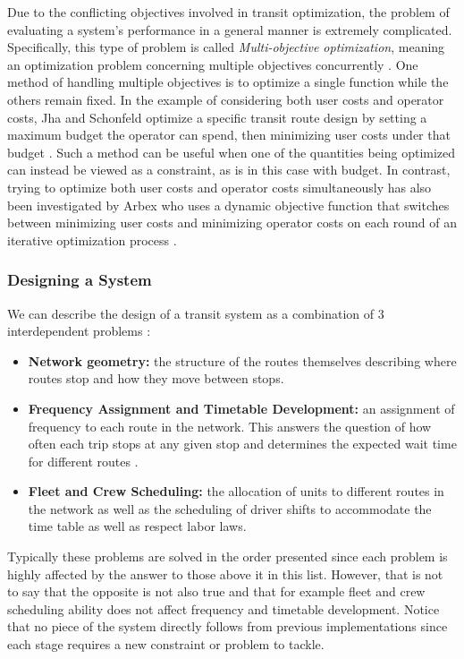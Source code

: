 \documentclass[11pt]{amsart}
\theoremstyle{definition}                  %
\theoremstyle{remark}                       %
\numberwithin{equation}{section}
\begin{document}
    Due to the conflicting objectives involved in transit optimization, the problem of evaluating a system's performance in a general manner is extremely complicated. 
    Specifically, this type of problem is called \textit{Multi-objective optimization}, meaning an optimization problem concerning multiple objectives concurrently \cite{arbex2015}. One method of handling multiple objectives is to optimize a single function while the others remain fixed. In the example of considering both user costs and operator costs, Jha and Schonfeld optimize a specific transit route design by setting a maximum budget the operator can spend, then minimizing user costs under that budget \cite{jha2007}. Such a method can be useful when one of the quantities being optimized can instead be viewed as a constraint, as is in this case with budget. In contrast, trying to optimize both user costs and operator costs simultaneously has also been investigated by Arbex who uses a dynamic objective function that switches between minimizing user costs and minimizing operator costs on each round of an iterative optimization process \cite{arbex2015}. 

    \subsubsection{Designing a System}
    We can describe the design of a transit system as a combination of $3$ interdependent problems \cite{arbex2015}:
    \begin{itemize}
        \item \textbf{Network geometry:} the structure of the routes themselves describing where routes stop and how they move between stops. 
        \item \textbf{Frequency Assignment and Timetable Development:} an assignment of frequency to each route in the network. This answers the question of how often each trip stops at any given stop and determines the expected wait time for different routes \cite{cevallos2006, hu2005}. 
        \item \textbf{Fleet and Crew Scheduling: } the allocation of units to different routes in the network as well as the scheduling of driver shifts to accommodate the time table as well as respect labor laws. 
    \end{itemize}
    Typically these problems are solved in the order presented since each problem is highly affected by the answer to those above it in this list. However, that is not to say that the opposite is not also true and that for example fleet and crew scheduling ability does not affect frequency and timetable development. Notice that no piece of the system directly follows from previous implementations since each stage requires a new constraint or problem to tackle. 
\end{document}
